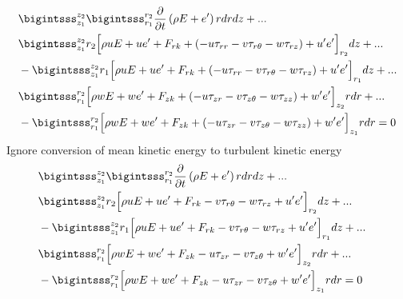 \documentclass[10pt,a4paper]{article}
\begin{document}
\begin{align}
&\begin{split}
&\bigintsss_{z_1}^{z_2} \bigintsss_{r_1}^{r_2}\frac{\partial}{\partial t} \left(\rho E+e'\right)r dr dz +...\\
&\bigintsss_{z_1}^{z_2} r_2\Big[\rho uE+ u e'+F_{rk}+  (-u\tau_{rr} -v\tau_{r \theta}-w\tau_{r z})+ u'e'\Big]_{r_2} dz+...\\
&-\bigintsss_{z_1}^{z_2}r_1\Big[\rho  uE+  u e'+F_{rk}+  (-u\tau_{rr} -v\tau_{r \theta}-w\tau_{r z})+u'e'\Big]_{r_1} dz+...\\
&\bigintsss_{r_1}^{r_2}\Big[\rho wE+ w e'+F_{zk}+ (-u\tau_{zr} -v\tau_{z \theta}-w\tau_{z z})+ w'e'\Big]_{z_2}rdr  +...\\
&-\bigintsss_{r_1}^{r_2}\Big[\rho  wE+ w e'+F_{zk}+ (-u\tau_{zr} -v\tau_{z \theta}-w\tau_{z z})+ w'e'\Big]_{z_1}rdr = 0
\end{split}\\
\end{align}
Ignore conversion of mean kinetic energy to turbulent kinetic energy
\begin{align}
&\begin{split}
&\bigintsss_{z_1}^{z_2} \bigintsss_{r_1}^{r_2}\frac{\partial}{\partial t} \left(\rho E+e'\right)r dr dz +...\\
&\bigintsss_{z_1}^{z_2} r_2\Big[\rho uE+ u e'+F_{rk}-v\tau_{r \theta}-w\tau_{r z}+ u'e'\Big]_{r_2} dz+...\\
&-\bigintsss_{z_1}^{z_2}r_1\Big[\rho  uE+  u e'+F_{rk}-v\tau_{r \theta}-w\tau_{r z}+u'e'\Big]_{r_1} dz+...\\
&\bigintsss_{r_1}^{r_2}\Big[\rho wE+ w e'+F_{zk}-u\tau_{zr} -v\tau_{z \theta}+ w'e'\Big]_{z_2}rdr  +...\\
&-\bigintsss_{r_1}^{r_2}\Big[\rho  wE+ w e'+F_{zk}-u\tau_{zr} -v\tau_{z \theta}+ w'e'\Big]_{z_1}rdr = 0
\end{split}
\end{align}
\end{document}

